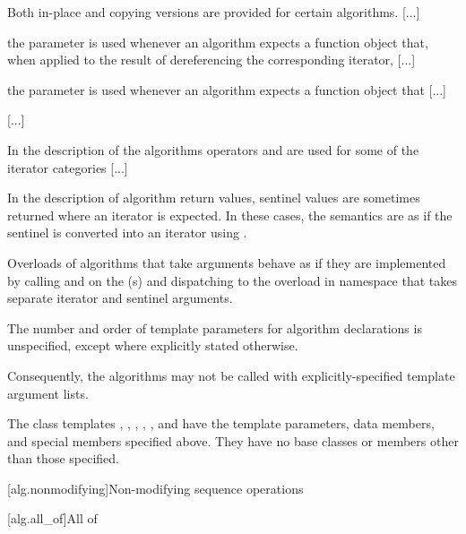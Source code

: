 \pnum
Both in-place and copying versions are provided for certain
algorithms. [...]

\pnum
{} the
parameter is used whenever an algorithm expects a function object
that, when applied to the result
of dereferencing the corresponding iterator, [...]

\pnum
{} the
parameter is used whenever an algorithm expects a function object that [...]

[...]

\setcounter{Paras}{10}
\pnum
In the description of the algorithms operators
\tcode{+}
and
\tcode{-}
are used for some of the iterator categories [...]

\begin{addedblock}
\pnum
In the description of algorithm return values, sentinel values are sometimes
returned where an iterator is expected. In these cases, the semantics are as
if the sentinel is converted into an iterator using
.

\pnum
Overloads of algorithms that take  arguments
behave as if they are implemented by calling  and
 on the (s) and dispatching
to the overload in namespace  that takes
separate iterator and sentinel arguments.

\pnum
The number and order of template parameters for algorithm declarations
is unspecified, except where explicitly stated otherwise.
\begin{note}
Consequently, the algorithms may not be called with
explicitly-specified template argument lists.
\end{note}

\pnum
The class templates  , ,
, , , and
 have the template parameters, data members, and
special members specified above. They have no base classes or members other than
those specified.
\end{addedblock}

\setcounter{section}{4}
[alg.nonmodifying]{Non-modifying sequence operations}

[alg.all_of]{All of}

